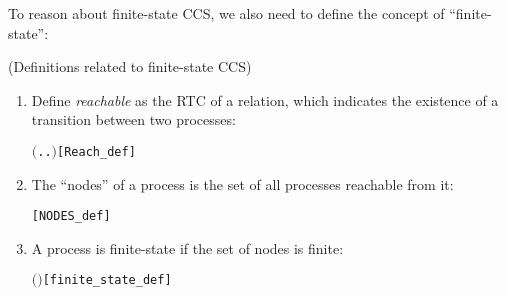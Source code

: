 
To reason about finite-state CCS, we also need to define the concept
of ``finite-state'':
\begin{definition}{(Definitions related to finite-state CCS)}
\begin{enumerate}
\item Define \emph{reachable} as the RTC of a relation, which
  indicates the existence of a transition between two processes:
\begin{alltt}
 \HOLSymConst{\HOLTokenDefEquality{}} \ensuremath{(}\HOLTokenLambda{} . \HOLSymConst{\HOLTokenExists{}}.  \HOLTokenTransBegin{}\HOLTokenTransEnd {}\ensuremath{)}\HOLSymConst{\HOLTokenSupStar{}}\hfill[Reach_def]
\end{alltt}
\item The ``nodes'' of a process is the set of all processes reachable
  from it:
\begin{alltt}
  \HOLSymConst{\HOLTokenDefEquality{}} \HOLTokenLeftbrace{} \HOLTokenBar{}   \HOLTokenRightbrace{}\hfill[NODES_def]
\end{alltt}
\item A process is finite-state if the set of nodes is finite:
\begin{alltt}
  \HOLSymConst{\HOLTokenDefEquality{}}  \ensuremath{(} \ensuremath{)}\hfill[finite_state_def]
\end{alltt}
\end{enumerate}
\end{definition}

